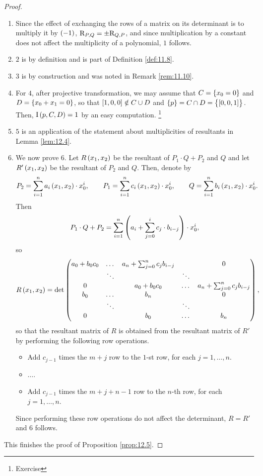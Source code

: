 \begin{proof}
\hfill
\begin{enumerate}
\item Since the effect of exchanging the rows of a matrix on its determinant is to multiply it by $ \br{-1} $, $ \mathrm{R}_{P, Q} = \pm\mathrm{R}_{Q, P} $, and since multiplication by a constant does not affect the multiplicity of a polynomial, $ 1 $ follows.
\item $ 2 $ is by definition and is part of Definition \ref{def:11.8}.
\item $ 3 $ is by construction and was noted in Remark \ref{rem:11.10}.
\item For $ 4 $, after projective transformation, we may assume that $ C = \cbr{x_0 = 0} $ and $ D = \cbr{x_0 + x_1 = 0} $, so that $ \sbr{1, 0, 0} \notin C \cup D $ and $ \cbr{p} = C \cap D = \cbr{\sbr{0, 0, 1}} $. Then, $ \I\br{p, C, D} = 1 $ by an easy computation. \footnote{Exercise}
\item $ 5 $ is an application of the statement about multiplicities of resultants in Lemma \ref{lem:12.4}.
\item We now prove $ 6 $. Let $ R\br{x_1, x_2} $ be the resultant of $ P_1 \cdot Q + P_2 $ and $ Q $ and let $ R'\br{x_1, x_2} $ be the resultant of $ P_2 $ and $ Q $. Then, denote by
$$ P_2 = \sum_{i = 1}^n a_i\br{x_1, x_2} \cdot x_0^i, \qquad P_1 = \sum_{i = 1}^n c_i\br{x_1, x_2} \cdot x_0^i, \qquad Q = \sum_{i = 1}^n b_i\br{x_1, x_2} \cdot x_0^i. $$
Then
$$ P_1 \cdot Q + P_2 = \sum_{i = 1}^n \br{a_i + \sum_{j = 0}^i c_j \cdot b_{i - j}} \cdot x_0^i, $$
so
$$ R\br{x_1, x_2} = \det
\begin{pmatrix}
a_0 + b_0c_0 & \dots & a_n + \sum_{j = 0}^n c_jb_{i - j} & & 0 \\
& \ddots & & \ddots & \\
0 & & a_0 + b_0c_0 & \dots & a_n + \sum_{j = 0}^n c_jb_{i - j} \\
b_0 & \dots & b_n & & 0 \\
& \ddots & & \ddots & \\
0 & & b_0 & \dots & b_n
\end{pmatrix},
$$
so that the resultant matrix of $ R $ is obtained from the resultant matrix of $ R' $ by performing the following row operations.
\begin{itemize}
\item Add $ c_{j - 1} $ times the $ m + j $ row to the $ 1 $-st row, for each $ j = 1, \dots, n $.
\item $ \dots $.
\item Add $ c_{j - 1} $ times the $ m + j + n - 1 $ row to the $ n $-th row, for each $ j = 1, \dots, n $.
\end{itemize}
Since performing these row operations do not affect the determinant, $ R = R' $ and $ 6 $ follows.
\end{enumerate}
This finishes the proof of Proposition \ref{prop:12.5}.
\end{proof}

